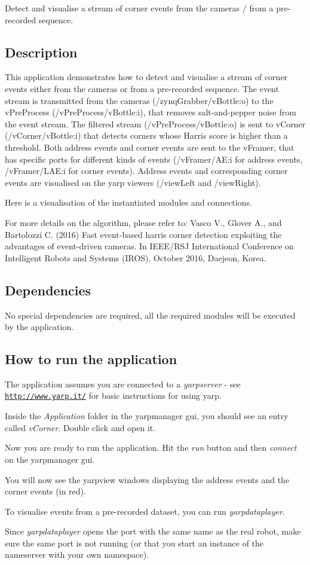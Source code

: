Detect and visualise a stream of corner events from the cameras / from a pre-\/recorded sequence.

\subsection*{Description}

This application demonstrates how to detect and visualise a stream of corner events either from the cameras or from a pre-\/recorded sequence. The event stream is transmitted from the cameras (/zynq\+Grabber/v\+Bottle\+:o) to the v\+Pre\+Process (/v\+Pre\+Process/v\+Bottle\+:i), that removes salt-\/and-\/pepper noise from the event stream. The filtered stream (/v\+Pre\+Process/v\+Bottle\+:o) is sent to v\+Corner (/v\+Corner/v\+Bottle\+:i) that detects corners whose Harris score is higher than a threshold. Both address events and corner events are sent to the v\+Framer, that has specific ports for different kinds of events (/v\+Framer/\+AE\+:i for address events, /v\+Framer/\+L\+AE\+:i for corner events). Address events and corresponding corner events are visualised on the yarp viewers (/view\+Left and /view\+Right).

Here is a visualisation of the instantiated modules and connections.



For more details on the algorithm, please refer to\+: Vasco V., Glover A., and Bartolozzi C. (2016) Fast event-\/based harris corner detection exploiting the advantages of event-\/driven cameras. In I\+E\+E\+E/\+R\+SJ International Conference on Intelligent Robots and Systems (I\+R\+OS), October 2016, Daejeon, Korea.

\subsection*{Dependencies}

No special dependencies are required, all the required modules will be executed by the application.

\subsection*{How to run the application}

The application assumes you are connected to a {\itshape yarpserver} -\/ see \href{http://www.yarp.it/}{\tt http\+://www.\+yarp.\+it/} for basic instructions for using yarp.

Inside the {\itshape Application} folder in the yarpmanager gui, you should see an entry called {\itshape v\+Corner}. Double click and open it.

Now you are ready to run the application. Hit the {\itshape run} button and then {\itshape connect} on the yarpmanager gui.

You will now see the yarpview windows displaying the address events and the corner events (in red).

To visualise events from a pre-\/recorded dataset, you can run {\itshape yarpdataplayer}.

Since {\itshape yarpdataplayer} opens the port with the same name as the real robot, make sure the same port is not running (or that you start an instance of the nameserver with your own namespace). 